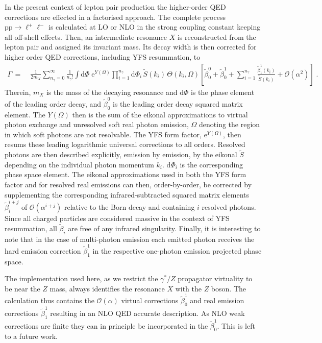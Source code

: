 \documentclass[11pt]{cernrep}
\newcommand{\order}{\ensuremath{\mathcal{O}}}
\newcommand{\rd}{\ensuremath{\mathrm{d}}} %
\newcommand{\re}{\ensuremath{\mathrm{e}}} %
\DeclareRobustCommand{\Plp}{{\ensuremath{\ell^+}}}
\DeclareRobustCommand{\Plm}{{\ensuremath{\ell^-}}}
\DeclareRobustCommand{\Pp}{{\ensuremath{\mathrm{p}}}}
\begin{document}
In the present context of lepton pair production the higher-order 
QED corrections are effected in a factorised approach. The complete 
process $\Pp\Pp\to\Plp\Plm$ is calculated at LO or NLO in the strong 
coupling constant keeping all off-shell effects. Then, an intermediate 
resonance $X$ is reconstructed from the lepton pair and assigned its 
invariant mass. Its decay width is then corrected for higher order 
QED corrections, including YFS resummation, to 
\begin{equation}
  \begin{split}\label{eq:dyew:comp:yfs}
    \Gamma
    \,=\;&
      \frac{1}{2m_X}\sum\limits_{n_\gamma=0}^\infty\frac{1}{n_\gamma !}
      \int\rd\Phi\;\re^{Y(\Omega)}
      \prod\limits_{i=1}^{n_\gamma}\rd\Phi_i\,\tilde{S}(k_i)\,\Theta(k_i,\Omega)
      \left[
        \tilde\beta_0^0
        +\tilde\beta_0^1
        +\sum\limits_{i=1}^{n_\gamma}\frac{\tilde\beta_1^1(k_i)}{\tilde{S}(k_i)}
        +\order(\alpha^2)
      \right]\;.
  \end{split}
\end{equation}
Therein, $m_X$ is the mass of the decaying resonance and $\rd\Phi$ 
is the phase element of the leading order decay, and $\tilde\beta_0^0$ is 
the leading order decay squared matrix element. The $Y(\Omega)$ then 
is the sum of the eikonal approximations to virtual photon exchange and 
unresolved soft real photon emission, $\Omega$ denoting the region in which 
soft photons are not resolvable. The YFS form factor, $\re^{Y(\Omega)}$, then 
resums these leading logarithmic universal corrections to all orders. 
Resolved photons are then described explicitly, emission by emission, 
by the eikonal $\tilde{S}$ depending on the individual photon momentum 
$k_i$. $\rd\Phi_i$ is the corresponding phase space element. The 
eikonal approximations used in both the YFS form factor and for 
resolved real emissions can then, order-by-order, be corrected by 
supplementing the corresponding infrared-subtracted squared matrix 
elements $\tilde\beta_i^{i+j}$ of $\order(\alpha^{i+j})$ relative to 
the Born decay and containing $i$ resolved photons. Since all charged 
particles are considered massive in the context of YFS resummation, 
all $\tilde\beta_i$ are free of any infrared singularity. Finally, it is 
interesting to note that in the case of multi-photon emission 
each emitted photon receives the hard emission correction $\tilde\beta_1^1$ 
in the respective one-photon emission projected phase space.

The implementation used here, as we restrict the $\gamma^*/Z$ propagator 
virtuality to be near the $Z$ mass, always identifies the resonance $X$ with 
the $Z$ boson. The calculation thus contains the $\order(\alpha)$ virtual 
corrections $\tilde\beta_0^1$ and real emission corrections $\tilde\beta_1^1$ 
resulting in an NLO QED accurate description. As NLO weak corrections 
are finite they can in principle be incorporated in the $\tilde\beta_0^1$. 
This is left to a future work.
\end{document}
